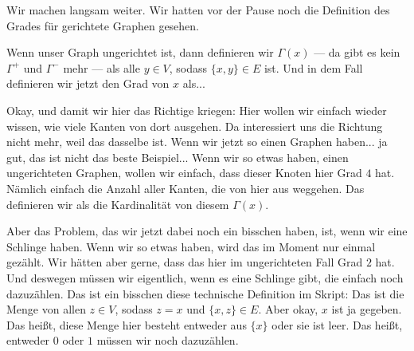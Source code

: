 \begin{spoken-clean}[00:45:03 - 00:47:17]
Wir machen langsam weiter. Wir hatten vor der Pause noch die Definition des Grades für gerichtete Graphen gesehen.

Wenn unser Graph ungerichtet ist, dann definieren wir $\Gamma(x)$ --- da gibt es kein $\Gamma^+$ und $\Gamma^-$ mehr --- als alle $y \in V$, sodass $\{x, y\} \in E$ ist. Und in dem Fall definieren wir jetzt den Grad von $x$ als...

Okay, und damit wir hier das Richtige kriegen: Hier wollen wir einfach wieder wissen, wie viele Kanten von dort ausgehen. Da interessiert uns die Richtung nicht mehr, weil das dasselbe ist. Wenn wir jetzt so einen Graphen haben... ja gut, das ist nicht das beste Beispiel... Wenn wir so etwas haben, einen ungerichteten Graphen, wollen wir einfach, dass dieser Knoten hier Grad $4$ hat. Nämlich einfach die Anzahl aller Kanten, die von hier aus weggehen. Das definieren wir als die Kardinalität von diesem $\Gamma(x)$.

Aber das Problem, das wir jetzt dabei noch ein bisschen haben, ist, wenn wir eine Schlinge haben. Wenn wir so etwas haben, wird das im Moment nur einmal gezählt. Wir hätten aber gerne, dass das hier im ungerichteten Fall Grad $2$ hat. Und deswegen müssen wir eigentlich, wenn es eine Schlinge gibt, die einfach noch dazuzählen. Das ist ein bisschen diese technische Definition im Skript: Das ist die Menge von allen $z \in V$, sodass $z = x$ und $\{x, z\} \in E$. Aber okay, $x$ ist ja gegeben. Das heißt, diese Menge hier besteht entweder aus $\{x\}$ oder sie ist leer. Das heißt, entweder $0$ oder $1$ müssen wir noch dazuzählen.
\end{spoken-clean}

\begin{math-stroke}
\end{math-stroke}

